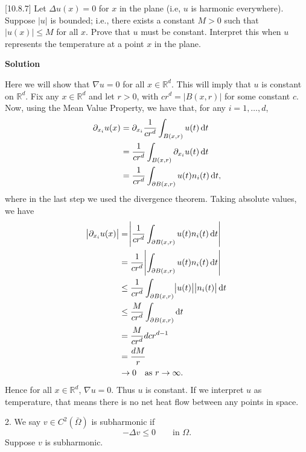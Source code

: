 \documentclass{article}
\begin{document}
\vspace{5mm}

[10.8.7] Let $\Delta u(x) = 0$ for $x$ in the plane (i.e, $u$ is
harmonic everywhere). Suppose $|u|$ is bounded; i.e., there exists a
constant $M > 0$ such that $|u(x)| \leq M$ for all $x$. Prove that $u$
must be constant. Interpret this when $u$ represents the temperature at
a point $x$ in the plane.

\textbf{Solution}

Here we will show that $\nabla u = 0$ for all $x \in \mathbb{R}^d$. This
will imply that $u$ is constant on $\mathbb{R}^d$. Fix any $x \in
\mathbb{R}^d$ and let $r > 0$, with $c r^d = |B(x, r)|$ for some constant
$c$. Now, using the Mean Value Property, we have that, for any $i = 1,
\ldots , d$,
%
\begin{align*}
    \partial_{x_i} u(x)
        &= \partial_{x_i} \frac{1}{c r^d} \int_{B(x, r)} u(t) \dif t \\
        &= \frac{1}{c r^d} \int_{B(x, r)} \partial_{x_i} u(t) \dif t \\
        &= \frac{1}{c r^d} \int_{\partial B(x, r)} u(t) n_i(t) \dif t
        ,
\end{align*}
%
where in the last step we used the divergence theorem. Taking absolute
values, we have
%
\begin{align*}
    \envert{\partial_{x_i} u(x)}
        &= \envert{\frac{1}{c r^d} \int_{\partial B(x, r)} u(t) n_i(t) \dif t} \\
        &= \frac{1}{c r^d} \envert{\int_{\partial B(x, r)} u(t) n_i(t) \dif t} \\
        &\leq \frac{1}{c r^d} \int_{\partial B(x, r)} \envert{u(t)} \envert{n_i(t)} \dif t \\
        &\leq \frac{M}{c r^d} \int_{\partial B(x, r)} \dif t \\
        &= \frac{M}{c r^d} d c r^{d - 1} \\
        &= \frac{d M}{r} \\
        &\to 0 \quad \text{as } r \to \infty
        .
\end{align*}
%
Hence for all $x \in \mathbb{R}^d$, $\nabla u = 0$. Thus $u$ is
constant. If we interpret $u$ as temperature, that means there is no net
heat flow between any points in space.

\newpage

2. We say $v \in C^2(\bar \Omega)$ is subharmonic if
%
\begin{equation*}
    - \Delta v \leq 0 \qquad \text{in } \Omega
    .
\end{equation*}
%
Suppose $v$ is subharmonic.
\end{document}
